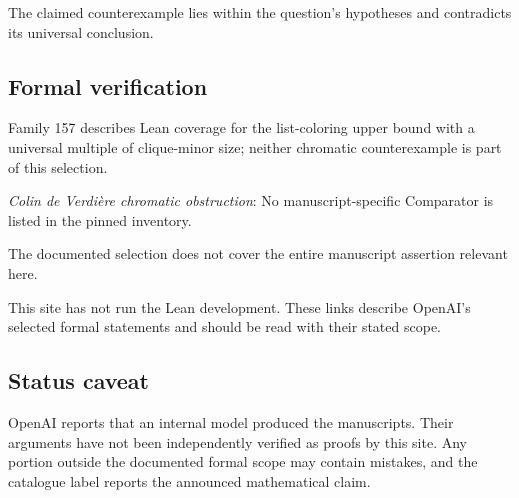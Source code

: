 \documentclass[11pt]{article}
\begin{document}
The claimed counterexample lies within the question’s hypotheses and contradicts its universal conclusion.

\subsection{Formal verification}
Family 157 describes Lean coverage for the list-coloring upper bound with a universal multiple of clique-minor size; neither chromatic counterexample is part of this selection.

\textit{Colin de Verdière chromatic obstruction}: No manuscript-specific Comparator is listed in the pinned inventory.

The documented selection does not cover the entire manuscript assertion relevant here.

This site has not run the Lean development. These links describe OpenAI’s selected formal statements and should be read with their stated scope.

\subsection{Status caveat}
OpenAI reports that an internal model produced the manuscripts. Their arguments have not been independently verified as proofs by this site. Any portion outside the documented formal scope may contain mistakes, and the catalogue label reports the announced mathematical claim.
\end{document}

